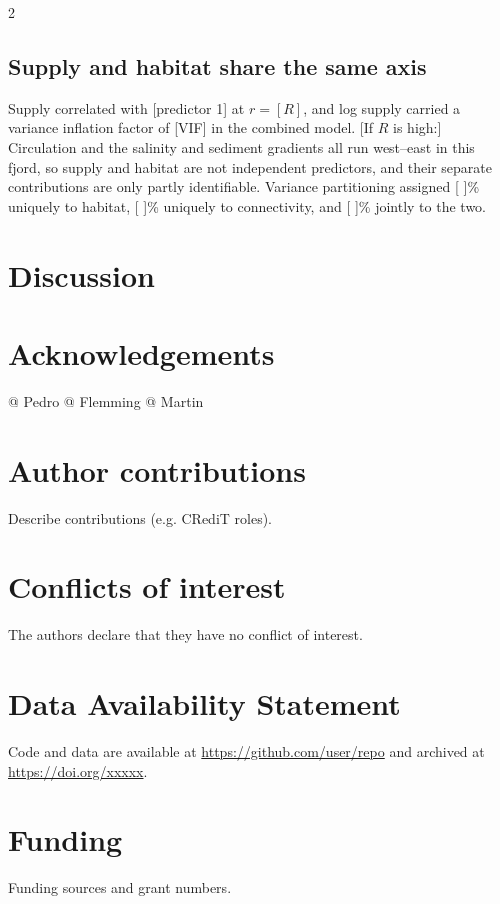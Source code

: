 \begin{spacing}{2}
\subsection{Supply and habitat share the same axis}
\label{sec:variance_partitioning}

Supply correlated with [predictor 1] at $r = [R]$, and log supply carried a variance inflation factor of [VIF] in the combined model. [If $R$ is high:] Circulation and the salinity and sediment gradients all run west--east in this fjord, so supply and habitat are not independent predictors, and their separate contributions are only partly identifiable. Variance partitioning assigned [ ]\% uniquely to habitat, [ ]\% uniquely to connectivity, and [ ]\% jointly to the two.

\section{Discussion}


\section{Acknowledgements}
@ Pedro
@ Flemming
@ Martin

\section{Author contributions}
Describe contributions (e.g. CRediT roles).

\section{Conflicts of interest}
The authors declare that they have no conflict of interest.

\section{Data Availability Statement}
Code and data are available at \url{https://github.com/user/repo} and archived
at \url{https://doi.org/xxxxx}.

\section{Funding}
Funding sources and grant numbers.



\end{spacing}
\clearpage

